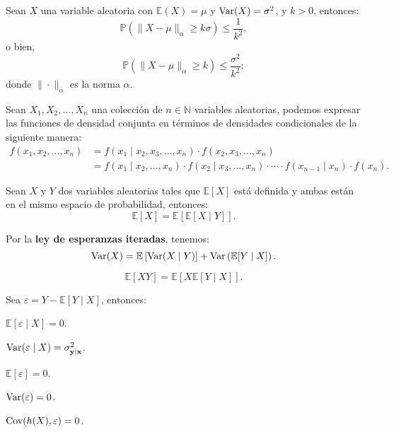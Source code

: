 \documentclass[8pt,a4paper]{extarticle}
\begin{document}
\begin{multicols}{3}
\begin{boxtheo}
	Sean $X$ una variable aleatoria con $\mathbb{E}(X) = \mu$ y $\text{\normalfont Var}(X) = \sigma^2$, y $k > 0$, entonces:
	\[
		\mathbb{P}\left( \|X - \mu\|_{\alpha} \ge k\sigma \right) \le \frac{1}{k^2}
	,\] 
	o bien,
	\[
		\mathbb{P}\left( \|X - \mu\|_{\alpha} \ge k \right) \le \frac{\sigma^2}{k^2}
	;\] 
	donde $\| \cdot \|_{\alpha}$ es la norma $\alpha$.
\end{boxtheo}

\begin{boxrmk}[]
	Sean $X_1, X_2, \ldots, X_n$ una colección de $n\in\mathbb{N}$ variables aleatorias, podemos expresar las funciones de densidad conjunta en términos de densidades condicionales de la siguiente manera:
	\begin{align*}
		f(x_1, x_2, \ldots, x_n) &= f(x_1  \mid x_2, x_3, \ldots, x_n)\cdot  f(x_2, x_3, \ldots, x_n) \\
								 &=  f(x_1  \mid x_2, \ldots, x_n) \cdot f(x_2  \mid x_3, \ldots, x_n) \cdot \cdots \cdot f(x_{n-1}  \mid x_n) \cdot f(x_{n})
	.\end{align*}
\end{boxrmk}

\begin{boxtheo}
	Sean $X$ y $Y$ dos variables aleatorias tales que $\mathbb{E}\left[ X \right] $ está definida y ambas están en el mismo espacio de probabilidad, entonces:
	\[
		\mathbb{E}\left[ X \right] = \mathbb{E}\left[ \mathbb{E}\left[ X  \mid Y \right]  \right] 
	.\] 
\end{boxtheo}

\begin{boxprop}[]
	Por la \textbf{ley de esperanzas iteradas}, tenemos:
	\[
		\text{\normalfont Var}(X) = \mathbb{E}\left[ \text{\normalfont Var}(X  \mid Y) \right] + \text{\normalfont Var} \left( \mathbb{E}[Y  \mid X] \right)
	.\] 
\end{boxprop}

\begin{boxprop}[]
	\[
		\mathbb{E}[XY] = \mathbb{E}\left[ X \mathbb{E}[Y  \mid  X] \right] 
	.\] 
\end{boxprop}

\begin{boxprop}[]
	Sea $\varepsilon = Y - \mathbb{E}[Y \mid X]$, entonces:
	\begin{eqlist}
	\item $\mathbb{E}[\varepsilon  \mid X] = 0$.
	\item $\text{\normalfont Var}(\varepsilon  \mid X) = \sigma^2_{\mathbf{y \mid x}}$.
	\item $\mathbb{E}[\varepsilon] = 0$.
	\item $\text{\normalfont Var}(\varepsilon) = 0$.
	\item $\text{\normalfont Cov}(h(X), \varepsilon) = 0$.
	\end{eqlist}
\end{boxprop}


\end{multicols}
\end{document}
